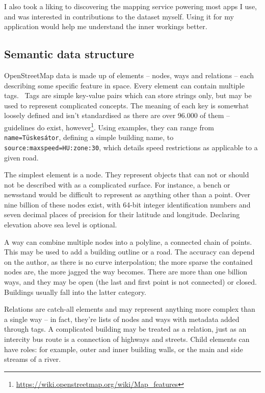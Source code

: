 I also took a liking to discovering the mapping service powering most apps I use, and was interested in contributions to the dataset myself. Using it for my application would help me understand the inner workings better.

\subsection{Semantic data structure}

OpenStreetMap data is made up of elements -- nodes, ways and relations -- each describing some specific feature in space. Every element can contain multiple tags.~\cite{osmElements} Tags are simple key-value pairs which can store strings only, but may be used to represent complicated concepts. The meaning of each key is somewhat loosely defined and isn't standardised as there are over 96.000 of them -- guidelines do exist, however\footnote{\url{https://wiki.openstreetmap.org/wiki/Map_features}}. Using examples, they can range from \verb|name=Tüskesátor|, defining a simple building name, to \verb|source:maxspeed=HU:zone:30|, which details speed restrictions as applicable to a given road.

The simplest element is a node. They represent objects that can not or should not be described with as a complicated surface. For instance, a bench or newsstand would be difficult to represent as anything other than a point. Over nine billion of these nodes exist, with 64-bit integer identification numbers and seven decimal places of precision for their latitude and longitude. Declaring elevation above sea level is optional.

A way can combine multiple nodes into a polyline, a connected chain of points. This may be used to add a building outline or a road. The accuracy can depend on the author, as there is no curve interpolation; the more sparse the contained nodes are, the more jagged the way becomes. There are more than one billion ways, and they may be open (the last and first point is not connected) or closed. Buildings usually fall into the latter category.

Relations are catch-all elements and may represent anything more complex than a single way -- in fact, they're lists of nodes and ways with metadata added through tags. A complicated building may be treated as a relation, just as an intercity bus route is a connection of highways and streets. Child elements can have roles: for example, outer and inner building walls, or the main and side streams of a river.

